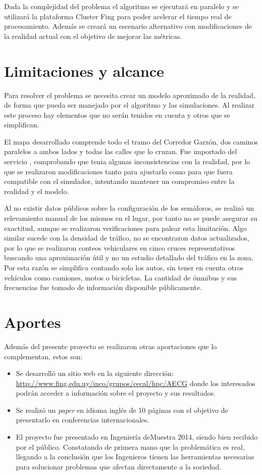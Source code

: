 Dada la complejidad del problema el algoritmo se ejecutará en paralelo y se utilizará la plataforma Cluster Fing para poder acelerar el tiempo real de procesamiento. Además se creará un escenario alternativo con modificaciones de la realidad actual con el objetivo de mejorar las métricas.

\section{Limitaciones y alcance}
Para resolver el problema se necesita crear un modelo aproximado de la realidad, de forma que pueda ser manejado por el algoritmo y las simulaciones. Al realizar este proceso hay elementos que no serán tenidos en cuenta y otros que se simplifican. 

El mapa desarrollado comprende todo el tramo del Corredor Garzón, dos caminos paralelos a ambos lados y todas las calles que lo cruzan. Fue importado del servicio \citep{OSM}, comprobando que tenia algunas inconsistencias con la realidad, por lo que se realizaron modificaciones tanto para ajustarlo como para que fuera compatible con el simulador, intentando mantener un compromiso entre la realidad y el modelo. 

Al no existir datos públicos sobre la configuración de los semáforos, se realizó un relevamiento manual de los mismos en el lugar, por tanto no se puede asegurar su exactitud, aunque se realizaron verificaciones para palear esta limitación. Algo similar sucede con la densidad de tráfico, no se encontraron datos actualizados, por lo que se realizaron conteos vehiculares en cinco cruces representativos buscando una aproximación útil y no un estudio detallado del tráfico en la zona. Por esta razón se simplifica contando solo los autos, sin tener en cuenta otros vehículos como camiones, motos o bicicletas. La cantidad de ómnibus y sus frecuencias fue tomado de información disponible públicamente.


\section{Aportes}
Además del presente proyecto se realizaron otras aportaciones que lo complementan, estos son: 
\begin{itemize}
	\item Se desarrolló un sitio web en la siguiente dirección: \url{http://www.fing.edu.uy/inco/grupos/cecal/hpc/AECG} donde los interesados podrán acceder a información sobre el proyecto y sus resultados. 
	\item Se realizó un \emph{paper} en idioma inglés de 10 páginas con el objetivo de presentarlo en conferencias internacionales.
	\item El proyecto fue presentado en Ingeniería deMuestra 2014, siendo bien recibido por el público. Constatando de primera mano que la problemática es real, llegando a la conclusión que los Ingenieros tienen las herramientas necesarias para solucionar problemas que afectan directamente a la sociedad.
\end{itemize}

